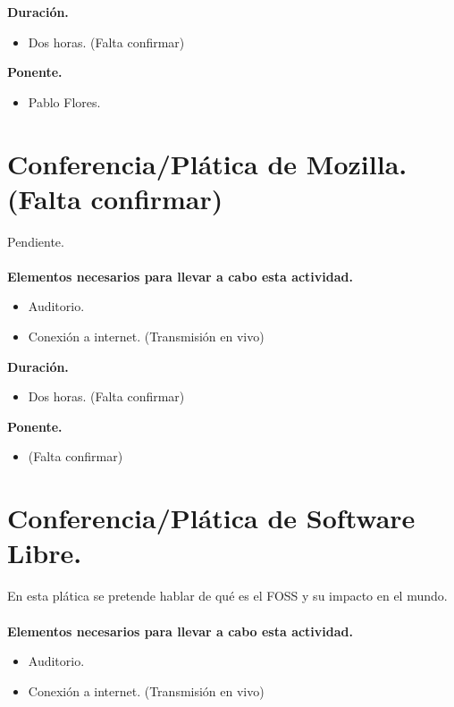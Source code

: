 \documentclass[a4paper,11pt]{article}                 %
\begin{document}
  \textbf{Duración.}
  \begin{itemize}
    \item Dos horas. (Falta confirmar)
  \end{itemize}
  
        \textbf{Ponente.}
  \begin{itemize}
    \item Pablo Flores.
  \end{itemize}
  
    \vspace{1 cm}
  
    \section{Conferencia/Plática de Mozilla.(Falta confirmar)}                                     %

   Pendiente.
      \paragraph{}
  \textbf{Elementos necesarios para llevar a cabo esta actividad.}
  \begin{itemize}
    \item Auditorio.
        \item Conexión a internet. (Transmisión en vivo)
  \end{itemize}
  
  \textbf{Duración.}
  \begin{itemize}
    \item Dos horas. (Falta confirmar)
  \end{itemize}
  
          \textbf{Ponente.}
  \begin{itemize}
    \item (Falta confirmar)
  \end{itemize}
  
      \section{Conferencia/Plática de Software Libre.}                                     %

   En esta plática se pretende hablar de qué es el FOSS y su impacto en el mundo. 
      \paragraph{}
  \textbf{Elementos necesarios para llevar a cabo esta actividad.}
  \begin{itemize}
    \item Auditorio.
        \item Conexión a internet. (Transmisión en vivo)
  \end{itemize}
  
\end{document}
